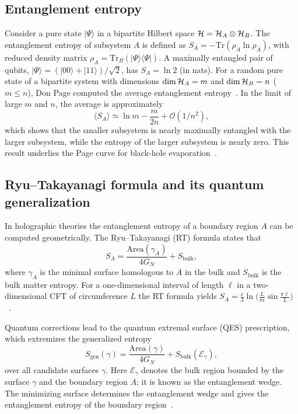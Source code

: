 \documentclass[12pt]{article}
\begin{document}
\subsection{Entanglement entropy}
Consider a pure state $|\Psi\rangle$ in a bipartite Hilbert space ${\cal H}= {\cal H}_A \otimes {\cal H}_B$.  The entanglement entropy of subsystem $A$ is defined as $S_A = -\mathrm{Tr}(\rho_A \ln \rho_A)$, with reduced density matrix $\rho_A=\mathrm{Tr}_B(|\Psi\rangle\langle\Psi|)$.  A maximally entangled pair of qubits, $|\Psi\rangle = (|00\rangle + |11\rangle)/\sqrt{2}$, has $S_A=\ln 2$ (in nats).  For a random pure state of a bipartite system with dimensions $\dim{\cal H}_A = m$ and $\dim{\cal H}_B = n$ ($m\le n$), Don Page computed the average entanglement entropy~\cite{Page:1993prl}.  In the limit of large $m$ and $n$, the average is approximately
\begin{equation}
\langle S_A \rangle \simeq \ln m - \frac{m}{2n} + \mathcal{O}(1/n^2),
\end{equation}
which shows that the smaller subsystem is nearly maximally entangled with the larger subsystem, while the entropy of the larger subsystem is nearly zero.  This result underlies the Page curve for black-hole evaporation~\cite{Page:1993prl}.

\subsection{Ryu--Takayanagi formula and its quantum generalization}
In holographic theories the entanglement entropy of a boundary region $A$ can be computed geometrically.  The Ryu–Takayanagi (RT) formula states that
\begin{equation}
S_A = \frac{\mathrm{Area}(\gamma_A)}{4G_N} + S_\text{bulk},
\label{RT}
\end{equation}
where $\gamma_A$ is the minimal surface homologous to $A$ in the bulk and $S_\text{bulk}$ is the bulk matter entropy.  For a one-dimensional interval of length $\ell$ in a two-dimensional CFT of circumference $L$ the RT formula yields $S_A = \frac{c}{3} \ln \big(\frac{L}{\pi\epsilon} \sin \frac{\pi \ell}{L}\big)$~\cite{Ryu:2006prl}.

Quantum corrections lead to the quantum extremal surface (QES) prescription, which extremizes the generalized entropy
\begin{equation}
S_\text{gen}(\gamma) = \frac{\mathrm{Area}(\gamma)}{4G_N} + S_\text{bulk}(\mathcal{E}_\gamma),
\label{QES}
\end{equation}
over all candidate surfaces $\gamma$.  Here $\mathcal{E}_\gamma$ denotes the bulk region bounded by the surface $\gamma$ and the boundary region $A$; it is known as the entanglement wedge.  The minimizing surface determines the entanglement wedge and gives the entanglement entropy of the boundary region~\cite{SciPost:2020islands}.
\end{document}
